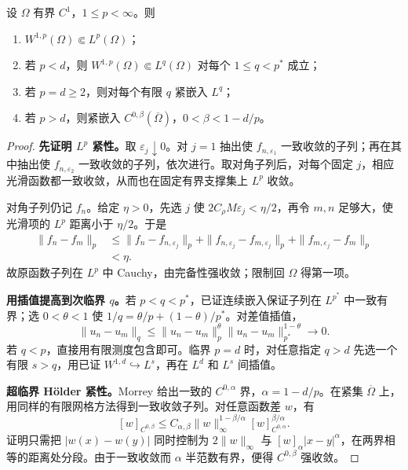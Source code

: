 \begin{theorem}\label{thm:sobolev-rellich}
设 $\Omega$ 有界 $C^1$，$1\le p<\infty$。则
\begin{enumerate}
 \item $W^{1,p}(\Omega)\Subset L^p(\Omega)$；
 \item 若 $p<d$，则 $W^{1,p}(\Omega)\Subset L^q(\Omega)$ 对每个 $1\le q<p^*$ 成立；
 \item 若 $p=d\ge2$，则对每个有限 $q$ 紧嵌入 $L^q$；
 \item 若 $p>d$，则紧嵌入 $C^{0,\beta}(\overline\Omega)$，$0<\beta<1-d/p$。
\end{enumerate}
\end{theorem}
\begin{proof}
\textbf{先证明 $L^p$ 紧性。}取 $\varepsilon_j\downarrow0$。对 $j=1$ 抽出使 $f_{n,\varepsilon_1}$ 一致收敛的子列；再在其中抽出使 $f_{n,\varepsilon_2}$ 一致收敛的子列，依次进行。取对角子列后，对每个固定 $j$，相应光滑函数都一致收敛，从而也在固定有界支撑集上 $L^p$ 收敛。

对角子列仍记 $f_n$。给定 $\eta>0$，先选 $j$ 使 $2C_\rho M\varepsilon_j<\eta/2$，再令 $m,n$ 足够大，使光滑项的 $L^p$ 距离小于 $\eta/2$。于是
\begin{align*}
 \|f_n-f_m\|_p
 &\le\|f_n-f_{n,\varepsilon_j}\|_p
     +\|f_{n,\varepsilon_j}-f_{m,\varepsilon_j}\|_p
     +\|f_{m,\varepsilon_j}-f_m\|_p\\
 &<\eta.
\end{align*}
故原函数子列在 $L^p$ 中 Cauchy，由完备性强收敛；限制回 $\Omega$ 得第一项。

\textbf{用插值提高到次临界 $q$。}若 $p<q<p^*$，已证连续嵌入保证子列在 $L^{p^*}$ 中一致有界；选 $0<\theta<1$ 使 $1/q=\theta/p+(1-\theta)/p^*$。对差值插值，
\[
 \|u_n-u_m\|_q\le\|u_n-u_m\|_p^\theta
                    \|u_n-u_m\|_{p^*}^{1-\theta}\to0.
\]
若 $q<p$，直接用有限测度包含即可。临界 $p=d$ 时，对任意指定 $q>d$ 先选一个有限 $s>q$，用已证 $W^{1,d}\hookrightarrow L^s$，再在 $L^d$ 和 $L^s$ 间插值。

\textbf{超临界 H\"older 紧性。}Morrey 给出一致的 $C^{0,\alpha}$ 界，$\alpha=1-d/p$。在紧集 $\overline\Omega$ 上，用同样的有限网格方法得到一致收敛子列。对任意函数差 $w$，有
\[
 [w]_{C^{0,\beta}}
 \le C_{\alpha,\beta}\|w\|_\infty^{1-\beta/\alpha}
                           [w]_{C^{0,\alpha}}^{\beta/\alpha}.
\]
证明只需把 $|w(x)-w(y)|$ 同时控制为 $2\|w\|_\infty$ 与 $[w]_\alpha|x-y|^\alpha$，在两界相等的距离处分段。由于一致收敛而 $\alpha$ 半范数有界，便得 $C^{0,\beta}$ 强收敛。
\end{proof}

